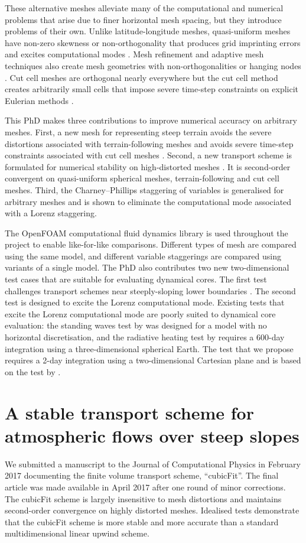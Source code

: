 \documentclass[a4paper,11pt]{article}
\begin{document}
These alternative meshes alleviate many of the computational and numerical problems that arise due to finer horizontal mesh spacing, but they introduce problems of their own.
Unlike latitude-longitude meshes, quasi-uniform meshes have non-zero skewness or non-orthogonality that produces grid imprinting errors and excites computational modes \citep{weller2012}.
Mesh refinement and adaptive mesh techniques also create mesh geometries with non-orthogonalities or hanging nodes \citep{marras2016}.
Cut cell meshes are orthogonal nearly everywhere but the cut cell method creates arbitrarily small cells that impose severe time-step constraints on explicit Eulerian methods \citep{klein2009}.

This PhD makes three contributions to improve numerical accuracy on arbitrary meshes.  First, a new mesh for representing steep terrain avoids the severe distortions associated with terrain-following meshes \citep{shaw-weller2016} and avoids severe time-step constraints associated with cut cell meshes \citep{shaw2017}.  Second, a new transport scheme is formulated for numerical stability on high-distorted meshes \citep{shaw2017}.  It is second-order convergent on quasi-uniform spherical meshes, terrain-following and cut cell meshes.
Third, the Charney--Phillips staggering of variables is generalised for arbitrary meshes and is shown to eliminate the computational mode associated with a Lorenz staggering.

The OpenFOAM computational fluid dynamics library is used throughout the project to enable like-for-like comparisons.  Different types of mesh are compared using the same model, and different variable staggerings are compared using variants of a single model.
The PhD also contributes two new two-dimensional test cases that are suitable for evaluating dynamical cores.  The first test challenges transport schemes near steeply-sloping lower boundaries \citep{shaw2017}.
The second test is designed to excite the Lorenz computational mode.  Existing tests that excite the Lorenz computational mode are poorly suited to dynamical core evaluation: the standing waves test by \citet{arakawa-konor1996} was designed for a model with no horizontal discretisation, and the radiative heating test by \cite{untch-hortal2004} requires a 600-day integration using a three-dimensional spherical Earth.  The test that we propose requires a 2-day integration using a two-dimensional Cartesian plane and is based on the test by \citet{arakawa-konor1996}.


\section{A stable transport scheme for atmospheric flows over steep slopes}
We submitted a manuscript to the Journal of Computational Physics in February 2017 documenting the finite volume transport scheme, ``cubicFit''.  The final article \citep{shaw2017} was made available in April 2017 after one round of minor corrections.  The cubicFit scheme is largely insensitive to mesh distortions and maintains second-order convergence on highly distorted meshes.  Idealised tests demonstrate that the cubicFit scheme is more stable and more accurate than a standard multidimensional linear upwind scheme.
\end{document}
